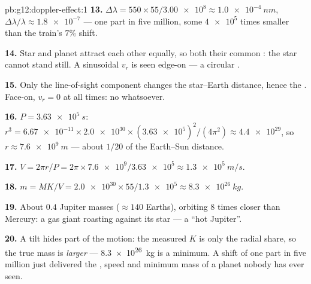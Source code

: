 \begin{solution}{pb:g12:doppler-effect:1}
\textbf{13.} $\Delta\lambda = 550 \times 55/\num{3.00e8} \approx \qty{1.0e-4}{nm}$,
$\Delta\lambda/\lambda \approx \num{1.8e-7}$ --- one part in five million, some
$\num{4e5}$ times smaller than the train's $7\%$ shift.

\textbf{14.} Star and planet attract each other equally, so both  their common
: the star cannot stand still. A sinusoidal $v_r$ is  seen edge-on --- a circular .

\textbf{15.} Only the line-of-sight component changes the star--Earth distance, hence
the . Face-on, $v_r = 0$ at all times: no  whatsoever.

\textbf{16.} $P = \qty{3.63e5}{s}$: $r^3 = \num{6.67e-11} \times \num{2.0e30} \times
(\num{3.63e5})^2/(4\pi^2) \approx \num{4.4e29}$, so $r \approx \qty{7.6e9}{m}$ ---
about $1/20$ of the Earth--Sun distance.

\textbf{17.} $V = 2\pi r/P = 2\pi \times \num{7.6e9}/\num{3.63e5} \approx
\qty{1.3e5}{m/s}$.

\textbf{18.} $m = M K/V = \num{2.0e30} \times 55/\num{1.3e5} \approx \qty{8.3e26}{kg}$.

\textbf{19.} About $0.4$ Jupiter masses ($\approx 140$ Earths), orbiting $8$ times
closer than Mercury: a gas giant roasting against its star --- a ``hot Jupiter''.

\textbf{20.} A tilt hides part of the motion: the measured $K$ is only the radial
share, so the true mass is \emph{larger} --- \qty{8.3e26}{kg} is a minimum. A 
shift of one part in five million just delivered the , speed and minimum mass of a
planet nobody has ever seen.
\end{solution}
